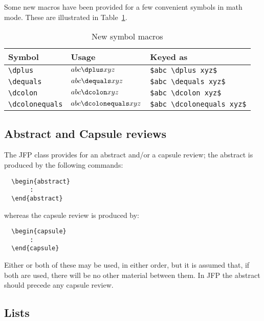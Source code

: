 \documentclass{jfp1}
\begin{document}
Some new macros have been provided for a few convenient symbols in
math mode.  These are illustrated in Table~\ref{newcommands}.
\ifprodtf\newpage\fi

\begin{table}
\caption{New symbol macros}\label{newcommands}
\programmath
\begin{tabular}{lll}
\hline\hline
Symbol                & Usage                  & Keyed as\\
\hline
\verb"\dplus"         & $abc \dplus xyz$         & \verb"$abc \dplus xyz$"\\
\verb"\dequals"       & $abc \dequals xyz$       & \verb"$abc \dequals xyz$"\\
\verb"\dcolon"        & $abc \dcolon xyz$        & \verb"$abc \dcolon xyz$"\\
\verb"\dcolonequals"  & $abc \dcolonequals xyz$  & \verb"$abc \dcolonequals xyz$"\\
\hline\hline
\end{tabular}
\unprogrammath
\end{table}

\subsection{Abstract and Capsule reviews}

The JFP class provides for an abstract and/or a capsule review; the
abstract is produced by the following commands:
%
\begin{verbatim}
  \begin{abstract}
       :
  \end{abstract}
\end{verbatim}
%
whereas the capsule review is produced by:
%
\begin{verbatim}
  \begin{capsule}
       :
  \end{capsule}
\end{verbatim}
%
Either or both of these may be used, in either order, but it is assumed
that, if both are used, there will be no other material between them.
In JFP the abstract should precede any capsule review.

\subsection{Lists}
\end{document}
